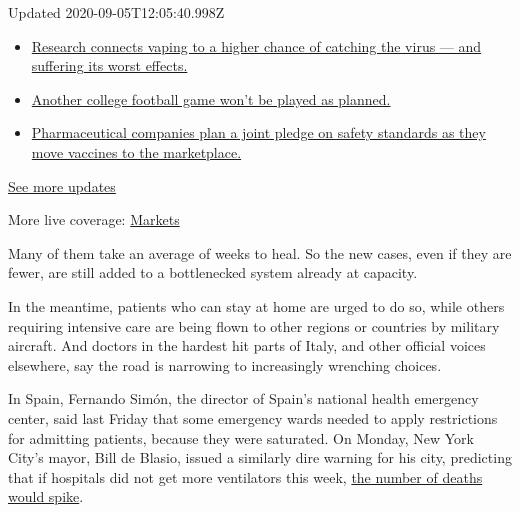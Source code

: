 Updated 2020-09-05T12:05:40.998Z

\begin{itemize}
\tightlist
\item
  \href{https://www.nytimes3xbfgragh.onion/2020/09/04/world/covid-19-coronavirus.html?action=click\&pgtype=Article\&state=default\&region=MAIN_CONTENT_1\&context=storylines_live_updates\#link-1654f6ad}{Research
  connects vaping to a higher chance of catching the virus --- and
  suffering its worst effects.}
\item
  \href{https://www.nytimes3xbfgragh.onion/2020/09/04/world/covid-19-coronavirus.html?action=click\&pgtype=Article\&state=default\&region=MAIN_CONTENT_1\&context=storylines_live_updates\#link-52e4198a}{Another
  college football game won't be played as planned.}
\item
  \href{https://www.nytimes3xbfgragh.onion/2020/09/04/world/covid-19-coronavirus.html?action=click\&pgtype=Article\&state=default\&region=MAIN_CONTENT_1\&context=storylines_live_updates\#link-181cef0}{Pharmaceutical
  companies plan a joint pledge on safety standards as they move
  vaccines to the marketplace.}
\end{itemize}

\href{https://www.nytimes3xbfgragh.onion/2020/09/04/world/covid-19-coronavirus.html?action=click\&pgtype=Article\&state=default\&region=MAIN_CONTENT_1\&context=storylines_live_updates}{See
more updates}

More live coverage:
\href{https://www.nytimes3xbfgragh.onion/live/2020/09/04/business/stock-market-today-coronavirus?action=click\&pgtype=Article\&state=default\&region=MAIN_CONTENT_1\&context=storylines_live_updates}{Markets}

Many of them take an average of weeks to heal. So the new cases, even if
they are fewer, are still added to a bottlenecked system already at
capacity.

In the meantime, patients who can stay at home are urged to do so, while
others requiring intensive care are being flown to other regions or
countries by military aircraft. And doctors in the hardest hit parts of
Italy, and other official voices elsewhere, say the road is narrowing to
increasingly wrenching choices.

In Spain, Fernando Simón, the director of Spain's national health
emergency center, said last Friday that some emergency wards needed to
apply restrictions for admitting patients, because they were saturated.
On Monday, New York City's mayor, Bill de Blasio, issued a similarly
dire warning for his city, predicting that if hospitals did not get more
ventilators this week,
\href{https://www.nytimes3xbfgragh.onion/2020/03/23/nyregion/coronavirus-new-york-update.html}{the
number of deaths would spike}.

